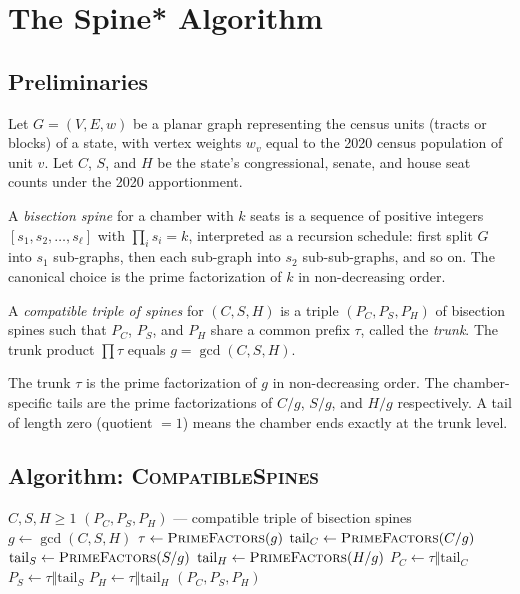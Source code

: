\section{The Spine* Algorithm}
\label{sec:algorithm}

\subsection{Preliminaries}

Let $G = (V, E, w)$ be a planar graph representing the census units (tracts
or blocks) of a state, with vertex weights $w_v$ equal to the 2020 census
population of unit $v$.  Let $C$, $S$, and $H$ be the state's congressional,
senate, and house seat counts under the 2020 apportionment.

A \emph{bisection spine} for a chamber with $k$ seats is a sequence of
positive integers $[s_1, s_2, \ldots, s_\ell]$ with $\prod_i s_i = k$,
interpreted as a recursion schedule: first split $G$ into $s_1$ sub-graphs,
then each sub-graph into $s_2$ sub-sub-graphs, and so on.  The canonical
choice is the prime factorization of $k$ in non-decreasing order.

\begin{definition}
\label{def:compatible}
A \emph{compatible triple of spines} for $(C, S, H)$ is a triple
$(P_C, P_S, P_H)$ of bisection spines such that $P_C$, $P_S$, and $P_H$
share a common prefix $\tau$, called the \emph{trunk}.  The trunk product
$\prod \tau$ equals $g = \gcd(C, S, H)$.
\end{definition}

The trunk $\tau$ is the prime factorization of $g$ in non-decreasing order.
The chamber-specific tails are the prime factorizations of $C/g$, $S/g$,
and $H/g$ respectively.  A tail of length zero (quotient $= 1$) means the
chamber ends exactly at the trunk level.

\subsection{Algorithm: \textsc{CompatibleSpines}}

\begin{algorithm}
\caption{\textsc{CompatibleSpines}$(C, S, H)$}
\label{alg:compatible_spines}
\begin{algorithmic}[1]
\Require $C, S, H \geq 1$
\Ensure $(P_C, P_S, P_H)$ --- compatible triple of bisection spines
\State $g \leftarrow \gcd(C, S, H)$
\State $\tau \leftarrow \textsc{PrimeFactors}(g)$ 
\State $\text{tail}_C \leftarrow \textsc{PrimeFactors}(C / g)$
\State $\text{tail}_S \leftarrow \textsc{PrimeFactors}(S / g)$
\State $\text{tail}_H \leftarrow \textsc{PrimeFactors}(H / g)$
\State $P_C \leftarrow \tau \Vert \text{tail}_C$
\State $P_S \leftarrow \tau \Vert \text{tail}_S$
\State $P_H \leftarrow \tau \Vert \text{tail}_H$
\State \Return $(P_C, P_S, P_H)$
\end{algorithmic}
\end{algorithm}

